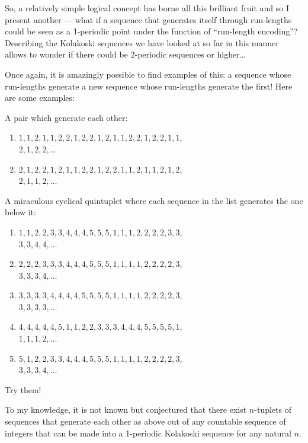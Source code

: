 So, a relatively simple logical concept has borne all this brilliant fruit and so I present another --- what if a sequence that generates itself through run-lengths could be seen as a 1-periodic point under the function of “run-length encoding”? Describing the Kolakoski sequences we have looked at so far in this manner allows to wonder if there could be 2-periodic sequences or higher…\par

Once again, it is amazingly possible to find examples of this: a sequence whose run-lengths generate a new sequence whose run-lengths generate the first! Here are some examples:\par

A pair which generate each other:\par
\begin{enumerate}
\item \(1, 1, 2, 1, 1, 2, 2, 1, 2, 2, 1, 2, 1, 1, 2, 2, 1, 2, 2, 1, 1,\)\\\( 2, 1, 2, 2, \ldots\)
\item \(2, 1, 2, 2, 1, 2, 1, 1, 2, 2, 1, 2, 2, 1, 1, 2, 1, 1, 2, 1, 2,\)\\\(2, 1, 1, 2, \ldots\)
\end{enumerate}
A miraculous cyclical quintuplet where each sequence in the list generates the one below it:\par
\begin{enumerate}
\item \(1, 1, 2, 2, 3, 3, 4, 4, 4, 5, 5, 5, 1, 1, 1, 2, 2, 2, 2, 3, 3,\)\\\(3, 3, 4, 4, \ldots\)
\item \(2, 2, 2, 3, 3, 3, 4, 4, 4, 5, 5, 5, 1, 1, 1, 1, 2, 2, 2, 2, 3,\)\\\(3, 3, 3, 4, \ldots\)
\item \(3, 3, 3, 3, 4, 4, 4, 4, 5, 5, 5, 5, 1, 1, 1, 1, 2, 2, 2, 2, 3,\)\\\(3, 3, 3, 3, \ldots\)
\item \(4, 4, 4, 4, 4, 5, 1, 1, 2, 2, 3, 3, 3, 4, 4, 4, 5, 5, 5, 5, 1,\)\\\(1, 1, 1, 2, \ldots\)
\item \(5, 1, 2, 2, 3, 3, 4, 4, 4, 5, 5, 5, 1, 1, 1, 1, 2, 2, 2, 2, 3,\)\\\(3, 3, 3, 4, \ldots\)
\end{enumerate}

Try them!\par
To my knowledge, it is not known but conjectured that there exist \(n\)-tuplets of sequences that generate each other as above out of any countable sequence of integers that can be made into a 1-periodic Kolakoski sequence for any natural \(n\).\par

